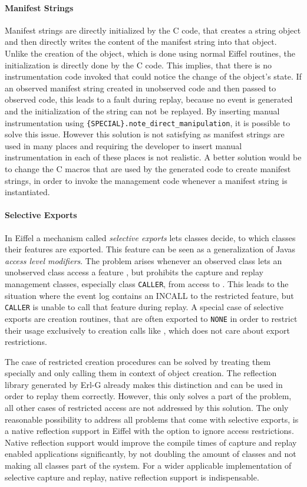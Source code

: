 \paragraph{Manifest Strings}
Manifest strings are directly initialized by the C code, that creates a string object and then directly writes the content of the manifest string into that object. Unlike the creation of the object, which is done using normal Eiffel routines, the initialization is directly done by the C code. This implies, that there is no instrumentation code invoked that could notice the change of the object's state. If an observed manifest string created in unobserved code and then passed to observed code, this leads to a fault during replay, because no event is generated and the initialization of the string can not be replayed. By inserting manual instrumentation using \texttt{\{SPECIAL\}.note\_direct\_manipulation}, it is possible to solve this issue. However this solution is not satisfying as manifest strings are used in many places and requiring the developer to insert manual instrumentation in each of these places is not realistic. A better solution would be to change the C macros that are used by the generated code to create manifest strings, in order to invoke the management code whenever a manifest string is instantiated.

\paragraph{Selective Exports}
In Eiffel a mechanism called \emph{selective exports} \cite{oosc2} lets classes decide, to which classes their features are exported. This feature can be seen as a generalization of Javas \emph{access level modifiers}. The problem arises whenever an observed class lets an unobserved class access a feature , but prohibits the capture and replay management classes, especially class \texttt{CALLER}, from access to . This leads to the situation where the event log contains an INCALL to the restricted feature, but \texttt{CALLER} is unable to call that feature during replay. A special case of selective exports are creation routines, that are often exported to \texttt{NONE} in order to restrict their usage exclusively to creation calls like , which does not care about export restrictions.

The case of restricted creation procedures can be solved by treating them specially and only calling them in context of object creation. The reflection library generated by Erl-G already makes this distinction and can be used in order to replay them correctly. However, this only solves a part of the problem, all other cases of restricted access are not addressed by this solution. The only reasonable possibility to address all problems that come with selective exports, is a native reflection support in Eiffel with the option to ignore access restrictions. Native reflection support would improve the compile times of capture and replay enabled applications significantly, by not doubling the amount of classes and not making all classes part of the system. For a wider applicable implementation of selective capture and replay, native reflection support is indispensable.

